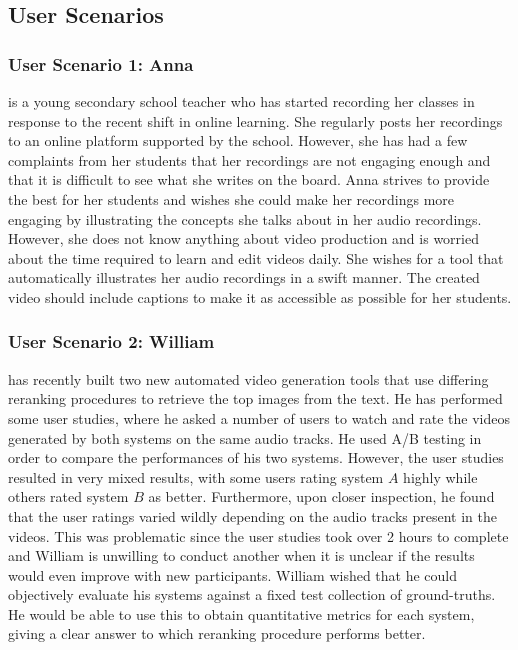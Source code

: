 \documentclass{l4proj}
\begin{document}
\subsection{User Scenarios}
\subsubsection{User Scenario 1: Anna} is a young secondary school teacher who has started recording her classes in response to the recent shift in online learning. She regularly posts her recordings to an online platform supported by the school. However, she has had a few complaints from her students that her recordings are not engaging enough and that it is difficult to see what she writes on the board. Anna strives to provide the best for her students and wishes she could make her recordings more engaging by illustrating the concepts she talks about in her audio recordings. However, she does not know anything about video production and is worried about the time required to learn and edit videos daily. She wishes for a tool that automatically illustrates her audio recordings in a swift manner. The created video should include captions to make it as accessible as possible for her students.

\subsubsection{User Scenario 2: William} has recently built two new automated video generation tools that use differing reranking procedures to retrieve the top images from the text. He has performed some user studies, where he asked a number of users to watch and rate the videos generated by both systems on the same audio tracks. He used A/B testing in order to compare the performances of his two systems. However, the user studies resulted in very mixed results, with some users rating system $A$ highly while others rated system $B$ as better. Furthermore, upon closer inspection, he found that the user ratings varied wildly depending on the audio tracks present in the videos. This was problematic since the user studies took over 2 hours to complete and William is unwilling to conduct another when it is unclear if the results would even improve with new participants. William wished that he could objectively evaluate his systems against a fixed test collection of ground-truths. He would be able to use this to obtain quantitative metrics for each system, giving a clear answer to which reranking procedure performs better.
\end{document}
